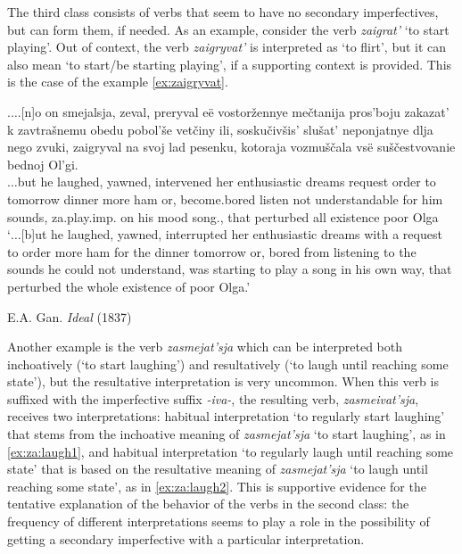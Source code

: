 The third class consists of verbs that seem to have no secondary imperfectives, but can form them, if needed. As an example, consider the verb \textit{zaigrat'} `to start playing'. Out of context, the verb \textit{zaigryvat'} is interpreted as `to flirt', but it can also mean `to start/be starting playing', if a supporting context is provided. This is the case of the example \ref{ex:zaigryvat}. 

\exg.\label{ex:zaigryvat}$\ldots$[n]o on smejalsja, zeval, preryval e\"{e} vostor\v{z}ennye me\v{c}tanija pros'boju zakazat' k zavtra\v{s}nemu obedu pobol'\v{s}e vet\v{c}iny ili, sosku\v{c}iv\v{s}is' slu\v{s}at' neponjatnye dlja nego zvuki, zaigryval na svoj lad pesenku, kotoraja vozmu\v{s}\v{c}ala vs\"{e} su\v{s}\v{c}estvovanie bednoj Ol'gi.\\
$\ldots$but he laughed, yawned, intervened her enthusiastic dreams request order to tomorrow dinner more ham or, {become.bored} listen {not understandable} for him sounds, za.play.imp. on his mood song., that perturbed all existence poor Olga\\
\vspace{0.5em}
`$\ldots$[b]ut he laughed, yawned, interrupted her enthusiastic dreams with a request to order more ham for the dinner tomorrow or, bored from listening to the sounds he could not understand, was starting to play a song in his own way, that perturbed the whole existence of poor Olga.'
\begin{flushright}
\vspace{-0.5em}
E.A. Gan. \textit{Ideal} (1837)
\end{flushright}

Another example is the verb \textit{zasmejat'sja} which can be interpreted both inchoatively (`to start laughing') and resultatively (`to laugh until reaching some state'), but the resultative interpretation is very uncommon. When this verb is suffixed with the imperfective suffix \textit{-iva-}, the resulting verb, \textit{zasmeivat'sja}, receives two interpretations: habitual interpretation `to regularly start laughing' that stems from the inchoative meaning of \textit{zasmejat'sja} `to start laughing', as in \ref{ex:za:laugh1}, and habitual interpretation `to regularly laugh until reaching some state' that is based on the resultative meaning of \textit{zasmejat'sja} `to laugh until reaching some state', as in \ref{ex:za:laugh2}. This is supportive evidence for the tentative explanation of the behavior of the verbs in the second class: the frequency of different interpretations seems to play a role in the possibility of getting a secondary imperfective with a particular interpretation.

